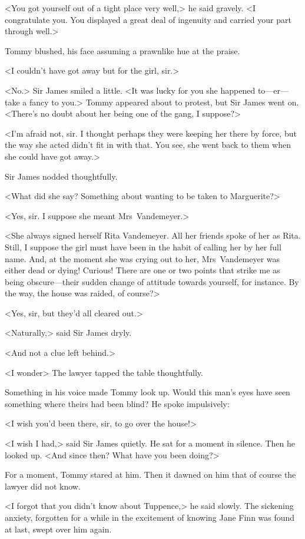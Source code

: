 <You got yourself out of a tight place very well,> he said gravely. <I congratulate you. You displayed a great deal of ingenuity and carried your part through well.>

Tommy blushed, his face assuming a prawnlike hue at the praise.

<I couldn't have got away but for the girl, sir.>

<No.> Sir James smiled a little. <It was lucky for you she happened to—er—take a fancy to you.> Tommy appeared about to protest, but Sir James went on. <There's no doubt about her being one of the gang, I suppose?>

<I'm afraid not, sir. I thought perhaps they were keeping her there by force, but the way she acted didn't fit in with that. You see, she went back to them when she could have got away.>

Sir James nodded thoughtfully.

<What did she say? Something about wanting to be taken to Marguerite?>

<Yes, sir. I suppose she meant Mrs~Vandemeyer.>

<She always signed herself Rita Vandemeyer. All her friends spoke of her as Rita. Still, I suppose the girl must have been in the habit of calling her by her full name. And, at the moment she was crying out to her, Mrs~Vandemeyer was either dead or dying! Curious! There are one or two points that strike me as being obscure—their sudden change of attitude towards yourself, for instance. By the way, the house was raided, of course?>

<Yes, sir, but they'd all cleared out.>

<Naturally,> said Sir James dryly.

<And not a clue left behind.>

<I wonder\longdash> The lawyer tapped the table thoughtfully.

Something in his voice made Tommy look up. Would this man's eyes have seen something where theirs had been blind? He spoke impulsively:

<I wish you'd been there, sir, to go over the house!>

<I wish I had,> said Sir James quietly. He sat for a moment in silence. Then he looked up. <And since then? What have you been doing?>

For a moment, Tommy stared at him. Then it dawned on him that of course the lawyer did not know.

<I forgot that you didn't know about Tuppence,> he said slowly. The sickening anxiety, forgotten for a while in the excitement of knowing Jane Finn was found at last, swept over him again.

